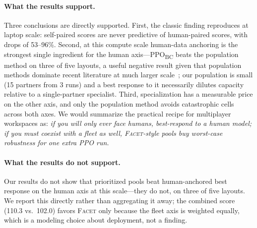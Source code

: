 \documentclass[11pt]{article}
\newcommand{\facet}{\textsc{Facet}}
\newcommand{\ppobc}{PPO\textsubscript{BC}}
\begin{document}
\paragraph{What the results support.}
Three conclusions are directly supported. First, the classic finding
reproduces at laptop scale: self-paired scores are never predictive of
human-paired scores, with drops of 53--96\%. Second, at this compute
scale human-data anchoring is the strongest single ingredient for the
human axis---\ppobc{} beats the population method on three of five
layouts, a useful negative result given that population methods dominate
recent literature at much larger scale~\citep{strouse2021collaborating,
zhao2023maximum}; our population is small (15 partners from 3 runs) and a
best response to it necessarily dilutes capacity relative to a
single-partner specialist. Third, specialization has a measurable price on
the other axis, and only the population method avoids catastrophic cells
across both axes. We would summarize the practical recipe for multiplayer
workspaces as: \emph{if you will only ever face humans, best-respond to a
human model; if you must coexist with a fleet as well, \facet{}-style
pools buy worst-case robustness for one extra PPO run.}

\paragraph{What the results do not support.}
Our results do not show that prioritized pools beat human-anchored best
response on the human axis at this scale---they do not, on three of five
layouts. We report this directly rather than aggregating it away; the
combined score (110.3 vs.\ 102.0) favors \facet{} only because the fleet
axis is weighted equally, which is a modeling choice about deployment,
not a finding.
\end{document}
